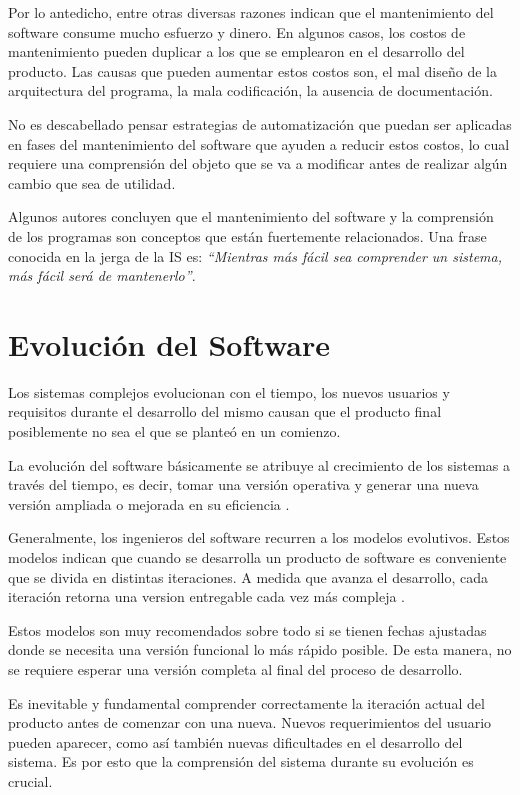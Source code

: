 Por lo antedicho, entre otras diversas razones \cite{KBVR00} indican que el man\-tenimiento del software consume mucho esfuerzo y dinero. En algunos casos, los costos de mantenimiento pueden duplicar a los que se emplearon en el desarro\-llo del producto. Las causas que pueden aumentar estos costos son, el mal diseño de la arquitectura del programa, la mala codificación, la ausencia de documentación.

No es descabellado pensar estrategias de automatización que puedan ser aplicadas en fases del mantenimiento del software que ayuden a reducir estos costos, lo cual requiere una comprensión del objeto que se va a modificar antes de realizar algún cambio que sea de utilidad.
 
Algunos autores \cite{KBVR00,MAS05,RSPMGH02,PFT02} concluyen que el mantenimiento del software y la comprensión de los programas son conceptos que están fuertemente relacionados. Una frase conocida en la jerga de la IS es: \textit{“Mientras más fácil sea comprender un sistema, más fácil será de mantenerlo”}.


\section{Evolución del Software}

Los sistemas complejos evolucionan con el tiempo, los nuevos usuarios y requisitos durante el desarrollo del mismo causan que el producto final posiblemente no sea el que se planteó en un comienzo. 

La evolución del software básicamente se atribuye al crecimiento de los sistemas a través del tiempo, es decir, tomar una versión operativa y generar una nueva versión ampliada o mejorada en su eficiencia \cite{KBVR00}.

Generalmente, los ingenieros del software recurren a los modelos evolutivos. Estos modelos indican que cuando se desarrolla un producto de software es conveniente que se divida en distintas iteraciones. A medida que avanza el desarrollo, cada iteración retorna una version entregable cada vez más compleja \cite{RSPMGH02}. 

Estos modelos son muy recomendados sobre todo si se tienen fechas ajustadas donde se necesita una versión funcional lo más rápido posible. De esta manera, no se requiere esperar una versión completa al final del proceso de desarrollo.

Es inevitable y fundamental comprender correctamente la iteración actual del producto antes de comenzar con una nueva. Nuevos requerimientos del usuario pueden aparecer, como así también nuevas dificultades en el desarrollo del sistema. Es por esto que la comprensión del sistema durante su evolución es crucial.

